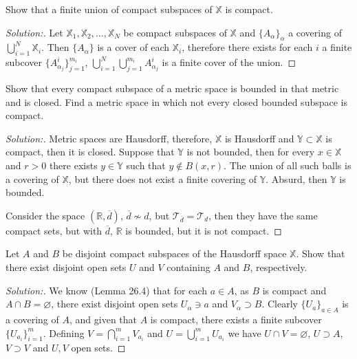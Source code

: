 \documentclass[a4paper,12pt, reqno]{article}
\theoremstyle{definition}
\newenvironment{exerr}[1]{
  \renewcommand\theexeralt{#1}
  \exeralt
}{\endexeralt}
\newenvironment{solution}{\begin{proof}[Solution:]}{\end{proof}}
\newcommand{\R}{\mathbb{R}}
\newcommand{\T}{\mathscr{T}}
\newcommand{\X}{\mathbb{X}}
\newcommand{\Y}{\mathbb{Y}}
\begin{document}
\begin{exerr}{3}
  Show that a finite union of compact subspaces of $\X$ is compact.
\end{exerr}
\begin{solution}
  Let $\X_{1},\X_{2},\dots,\X_{N}$ be compact subspaces of $\X$ and $\{ A_{\alpha} \}_{\alpha}$ a covering of $\bigcup_{i=1}^N\X_{i}$. Then $\{ A_{\alpha} \}$ is a cover of each $\X_{i}$, therefore there exists for each $i$ a finite subcover $\{ A_{\alpha_{j}}^i \}_{j=1}^{m_{i}}$, $\bigcup_{i=1}^N\bigcup_{j=1}^{m_{i}}A_{\alpha_{j}}^i$ is a finite cover of the union.
\end{solution}

\begin{exerr}{4}
  Show that every compact subspace of a metric space is bounded in that metric and is closed. Find a metric space in which not every closed bounded subspace is compact.
\end{exerr}
\begin{solution}
  Metric spaces are Hausdorff, therefore, $\X$ is Hausdorff and $\Y\subset\X$ is compact, then it is closed. Suppose that $\Y$ is not bounded, then for every $x\in\X$ and $r>0$ there exists $y\in\Y$ such that $y\notin B(x,r)$. The union of all such balls is a covering of $\X$, but there does not exist a finite covering of $\Y$. Absurd, then $\Y$ is bounded.

  Consider the space $(\R,\overline{d})$, $\overline{d}\not\sim d$, but $\T_{\overline{d}} = \T_{d}$, then they have the same compact sets, but with $\overline{d}$, $\R$ is bounded, but it is not compact.
\end{solution}

\begin{exerr}{5}
  Let $A$ and $B$ be disjoint compact subspaces of the Hausdorff space $\X$. Show that there exist disjoint open sets $U$ and $V$ containing $A$ and $B$, respectively.
\end{exerr}
\begin{solution}
  We know (Lemma 26.4) that for each $a\in A$, as $B$ is compact and $A\cap B=\varnothing$, there exist disjoint open sets $U_{\alpha}\ni a$ and $V_{\alpha}\supset B$. Clearly $\{ U_{a} \}_{a\in A}$ is a covering of $A$, and given that $A$ is compact, there exists a finite subcover $\{ U_{a_{i}} \}_{i=1}^m$. Defining $V = \bigcap_{i=1}^m V_{a_{i}}$ and $U = \bigcup_{i=1}^m U_{a_{i}}$ we have $U\cap V =\varnothing$, $U\supset A$, $V\supset V$ and $U,V$ open sets.
\end{solution}
\end{document}
